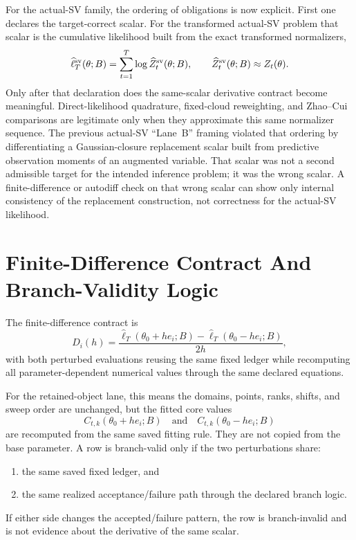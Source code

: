 For the actual-SV family, the ordering of obligations is now explicit.  First
one declares the target-correct scalar.  For the transformed actual-SV problem
that scalar is the cumulative likelihood built from the exact transformed
normalizers,
\[
  \widehat\ell_T^{\rm sv}(\theta;B)
  =
  \sum_{t=1}^T \log \widehat Z_t^{\rm sv}(\theta;B),
  \qquad
  \widehat Z_t^{\rm sv}(\theta;B)\approx Z_t(\theta).
\]
Only after that declaration does the same-scalar derivative contract become
meaningful.  Direct-likelihood quadrature, fixed-cloud reweighting, and
Zhao--Cui comparisons are legitimate only when they approximate this same
normalizer sequence.  The previous actual-SV ``Lane~B'' framing violated that
ordering by differentiating a Gaussian-closure replacement scalar built from
predictive observation moments of an augmented variable.  That scalar was not a
second admissible target for the intended inference problem; it was the wrong
scalar.  A finite-difference or autodiff check on that wrong scalar can show only
internal consistency of the replacement construction, not correctness for the
actual-SV likelihood.

\section{Finite-Difference Contract And Branch-Validity Logic}
\label{sec:bf-hd-fixed-branch-fd-contract}

The finite-difference contract is
\begin{equation}
  D_i(h)=
  \frac{\widehat\ell_T(\theta_0+h e_i;B)-\widehat\ell_T(\theta_0-h e_i;B)}{2h},
  \label{eq:bf-hd-fixed-branch-fd}
\end{equation}
with both perturbed evaluations reusing the same fixed ledger while recomputing
all parameter-dependent numerical values through the same declared equations.

For the retained-object lane, this means the domains, points, ranks, shifts, and
sweep order are unchanged, but the fitted core values
\begin{equation}
  C_{t,k}(\theta_0+h e_i;B)
  \quad\text{and}\quad
  C_{t,k}(\theta_0-h e_i;B)
  \label{eq:bf-hd-ttkr-perturbed-cores}
\end{equation}
are recomputed from the same saved fitting rule.  They are not copied from the
base parameter.  A row is branch-valid only if the two perturbations share:
\begin{enumerate}[label=(\roman*), leftmargin=0.28in]
  \item the same saved fixed ledger, and
  \item the same realized acceptance/failure path through the declared branch
  logic.
\end{enumerate}
If either side changes the accepted/failure pattern, the row is branch-invalid
and is not evidence about the derivative of the same scalar.


